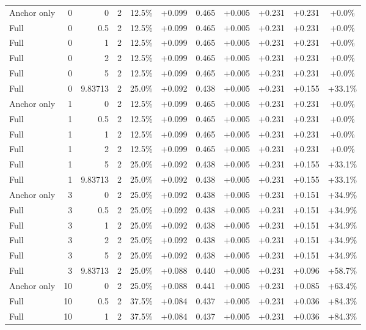 \begin{table}[htbp]
\begin{tabular}{lrrrccccccc}
Anchor only & 0 & 0 & 2 & 12.5\% & +0.099 & 0.465 & +0.005 & +0.231 & +0.231 & +0.0\% \\
Full & 0 & 0.5 & 2 & 12.5\% & +0.099 & 0.465 & +0.005 & +0.231 & +0.231 & +0.0\% \\
Full & 0 & 1 & 2 & 12.5\% & +0.099 & 0.465 & +0.005 & +0.231 & +0.231 & +0.0\% \\
Full & 0 & 2 & 2 & 12.5\% & +0.099 & 0.465 & +0.005 & +0.231 & +0.231 & +0.0\% \\
Full & 0 & 5 & 2 & 12.5\% & +0.099 & 0.465 & +0.005 & +0.231 & +0.231 & +0.0\% \\
Full & 0 & 9.83713 & 2 & 25.0\% & +0.092 & 0.438 & +0.005 & +0.231 & +0.155 & +33.1\% \\
Anchor only & 1 & 0 & 2 & 12.5\% & +0.099 & 0.465 & +0.005 & +0.231 & +0.231 & +0.0\% \\
Full & 1 & 0.5 & 2 & 12.5\% & +0.099 & 0.465 & +0.005 & +0.231 & +0.231 & +0.0\% \\
Full & 1 & 1 & 2 & 12.5\% & +0.099 & 0.465 & +0.005 & +0.231 & +0.231 & +0.0\% \\
Full & 1 & 2 & 2 & 12.5\% & +0.099 & 0.465 & +0.005 & +0.231 & +0.231 & +0.0\% \\
Full & 1 & 5 & 2 & 25.0\% & +0.092 & 0.438 & +0.005 & +0.231 & +0.155 & +33.1\% \\
Full & 1 & 9.83713 & 2 & 25.0\% & +0.092 & 0.438 & +0.005 & +0.231 & +0.155 & +33.1\% \\
Anchor only & 3 & 0 & 2 & 25.0\% & +0.092 & 0.438 & +0.005 & +0.231 & +0.151 & +34.9\% \\
Full & 3 & 0.5 & 2 & 25.0\% & +0.092 & 0.438 & +0.005 & +0.231 & +0.151 & +34.9\% \\
Full & 3 & 1 & 2 & 25.0\% & +0.092 & 0.438 & +0.005 & +0.231 & +0.151 & +34.9\% \\
Full & 3 & 2 & 2 & 25.0\% & +0.092 & 0.438 & +0.005 & +0.231 & +0.151 & +34.9\% \\
Full & 3 & 5 & 2 & 25.0\% & +0.092 & 0.438 & +0.005 & +0.231 & +0.151 & +34.9\% \\
Full & 3 & 9.83713 & 2 & 25.0\% & +0.088 & 0.440 & +0.005 & +0.231 & +0.096 & +58.7\% \\
Anchor only & 10 & 0 & 2 & 25.0\% & +0.088 & 0.441 & +0.005 & +0.231 & +0.085 & +63.4\% \\
Full & 10 & 0.5 & 2 & 37.5\% & +0.084 & 0.437 & +0.005 & +0.231 & +0.036 & +84.3\% \\
Full & 10 & 1 & 2 & 37.5\% & +0.084 & 0.437 & +0.005 & +0.231 & +0.036 & +84.3\% \\

\end{tabular}
\end{table}
